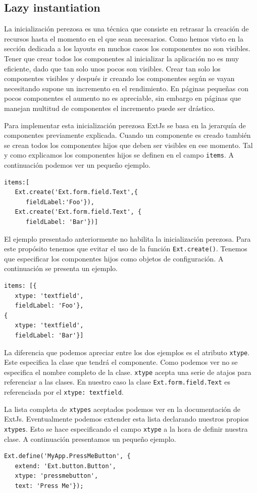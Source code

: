	\subsection{Lazy instantiation}
		La inicialización perezosa es una técnica que consiste en retrasar la creación de recursos hasta el momento en el que sean necesarios.
		Como hemos visto en la sección dedicada a los layouts en muchos casos los componentes no son visibles. Tener que crear todos los
		componentes al inicializar la aplicación no es muy eficiente, dado que tan solo unos pocos son visibles. Crear tan solo los
		componentes visibles y después ir creando los componentes según se vayan necesitando supone un incremento en el rendimiento. En
		páginas pequeñas con pocos componentes el aumento no es apreciable, sin embargo en páginas que manejan multitud de componentes el
		incremento puede ser drástico. 
		\par
		Para implementar esta inicialización perezosa ExtJs se basa en la jerarquía de componentes previamente explicada. Cuando un componente
		es creado también se crean todos los componentes hijos que deben ser visibles en ese momento. Tal y como explicamos los componentes
		hijos se definen en el campo \texttt{items}. A continuación podemos ver un pequeño ejemplo. 
		\begin{lstlisting}
items:[
   Ext.create('Ext.form.field.Text',{
      fieldLabel:'Foo'}),
   Ext.create('Ext.form.field.Text', {
      fieldLabel: 'Bar'})]
		\end{lstlisting}
		El ejemplo presentado anteriormente no habilita la inicialización perezosa. Para este propósito tenemos que evitar el uso de la
		función \texttt{Ext.create()}. Tenemos que especificar los componentes hijos como objetos de configuración. A continuación se presenta
		un ejemplo.
		\begin{lstlisting}
items: [{
   xtype: 'textfield',
   fieldLabel: 'Foo'},
{
   xtype: 'textfield',
   fieldLabel: 'Bar'}]
		\end{lstlisting}
		La diferencia que podemos apreciar entre los dos ejemplos es el atributo \texttt{xtype}. Este especifica la clase que tendrá el
		componente.  Como podemos ver no se especifica el nombre completo de la clase. \texttt{xtype} acepta una serie de atajos para
		referenciar a las clases. En nuestro caso la clase \texttt{Ext.form.field.Text} es referenciada por el \texttt{xtype:\cc
		textfield\cc}.
		\par
		La lista completa de \texttt{xtypes} aceptados podemos ver en la documentación de ExtJs\cite{ExtJsDoc}. Eventualmente podemos extender
		esta lista declarando nuestros propios \texttt{xtypes}. Esto se hace especificando el campo \texttt{xtype} a la hora de definir
		nuestra clase. A continuación presentamos un pequeño ejemplo.
		\begin{lstlisting}
Ext.define('MyApp.PressMeButton', {
   extend: 'Ext.button.Button',
   xtype: 'pressmebutton',
   text: 'Press Me'});
		\end{lstlisting}

